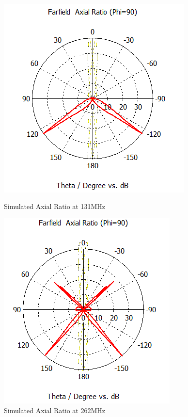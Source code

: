 \begin{figure}[H]
  \centering
  \begin{minipage}[b]{0.5\textwidth}
	\includegraphics[scale = 0.6]{figures/antennas/qha/qha_6_ff_131_AR}
	\caption{Simulated Axial Ratio at 131MHz}	
    \label{fig:QHA_ff_131_AR}
  \end{minipage}
  \hfill
  \begin{minipage}[b]{0.4 \textwidth}
	\includegraphics[scale = 0.6]{figures/antennas/qha/qha_6_ff_262_AR}
	\caption{Simulated Axial Ratio at 262MHz}
    \label{fig:QHA_ff_262_AR}
  \end{minipage}
\end{figure}

